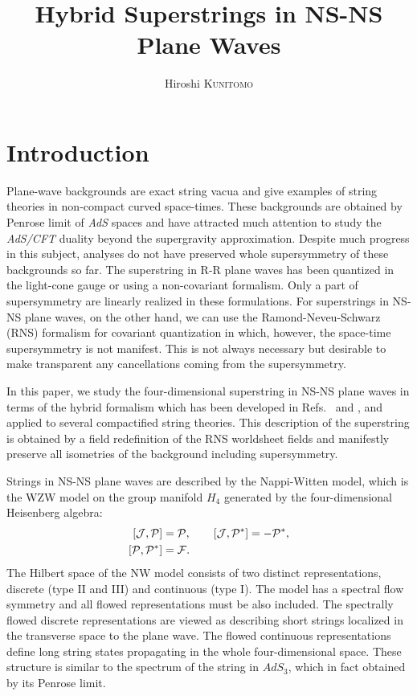 \documentclass[a4paper,seceq,preprint]{ptptex}
\title{%
Hybrid Superstrings in NS-NS Plane Waves
}
\author{%
Hiroshi \textsc{Kunitomo}%
}
\begin{document}
\maketitle

\section{Introduction}\label{intro}

Plane-wave backgrounds are exact string vacua and 
give examples of string theories in non-compact 
curved space-times. These backgrounds are obtained 
by Penrose limit of {\it AdS} spaces and have 
attracted much attention to study the {\it AdS/CFT} 
duality beyond the supergravity approximation.\cite{BMN} 
Despite much progress in this subject, analyses do not
have preserved whole supersymmetry of these 
backgrounds so far. The superstring in R-R plane waves has 
been quantized in the light-cone gauge\cite{M} or using 
a non-covariant formalism.\cite{BM} Only a part of 
supersymmetry are linearly realized in these formulations.
For superstrings in NS-NS plane waves, on the other hand,
we can use the Ramond-Neveu-Schwarz (RNS)
formalism for covariant quantization
in which, however, the space-time
supersymmetry is not manifest.
This is not always necessary but desirable to make 
transparent any cancellations coming from the supersymmetry. 

In this paper, we study the four-dimensional superstring 
in NS-NS plane waves in terms of the hybrid formalism
which has been developed in Refs.~ and , 
and applied to several compactified string theories.\cite{compact}
This description of the superstring is obtained by 
a field redefinition of the RNS worldsheet fields and 
manifestly preserve all isometries of the background 
including supersymmetry.

Strings in NS-NS plane waves are described
by the Nappi-Witten model,\cite{NW} which is the WZW model 
on the group manifold $H_4$ generated by the four-dimensional 
Heisenberg algebra:
\begin{align}
  \left[{\cal J},{\cal P}\right]&={\cal P},\qquad
  \left[{\cal J},{\cal P}^*\right]=-{\cal P}^*,\nonumber\\
  \left[{\cal P},{\cal P}^*\right]&={\cal F}.\label{glbnw}
\end{align}
The Hilbert space of the NW model consists of two 
distinct representations, discrete (type II and III)
and continuous (type I). The model has a spectral 
flow symmetry and all flowed representations must be 
also included.\cite{KK,KP} 
The spectrally flowed discrete representations are 
viewed as describing short strings localized 
in the transverse space to the plane wave.
The flowed continuous representations define
long string states propagating 
in the whole four-dimensional space.
These structure is similar to the spectrum of 
the string in $AdS_3$,\cite{MO} 
which in fact obtained by its Penrose limit.\cite{HS2}
\end{document}
